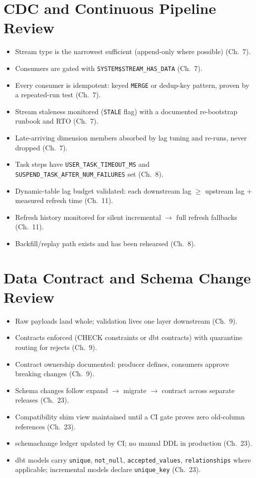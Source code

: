 \section{CDC and Continuous Pipeline Review}
\begin{itemize}
    \item[$\square$] Stream type is the narrowest sufficient (append-only where possible) (Ch.~7).
    \item[$\square$] Consumers are gated with \texttt{SYSTEM\$STREAM\_HAS\_DATA} (Ch.~7).
    \item[$\square$] Every consumer is idempotent: keyed \texttt{MERGE} or dedup-key pattern, proven by a repeated-run test (Ch.~7).
    \item[$\square$] Stream staleness monitored (\texttt{STALE} flag) with a documented re-bootstrap runbook and RTO (Ch.~7).
    \item[$\square$] Late-arriving dimension members absorbed by lag tuning and re-runs, never dropped (Ch.~7).
    \item[$\square$] Task steps have \texttt{USER\_TASK\_TIMEOUT\_MS} and \texttt{SUSPEND\_TASK\_AFTER\_NUM\_FAILURES} set (Ch.~8).
    \item[$\square$] Dynamic-table lag budget validated: each downstream lag $\geq$ upstream lag + measured refresh time (Ch.~11).
    \item[$\square$] Refresh history monitored for silent incremental $\rightarrow$ full refresh fallbacks (Ch.~11).
    \item[$\square$] Backfill/replay path exists and has been rehearsed (Ch.~8).
\end{itemize}

\section{Data Contract and Schema Change Review}
\begin{itemize}
    \item[$\square$] Raw payloads land whole; validation lives one layer downstream (Ch.~9).
    \item[$\square$] Contracts enforced (CHECK constraints or dbt contracts) with quarantine routing for rejects (Ch.~9).
    \item[$\square$] Contract ownership documented: producer defines, consumers approve breaking changes (Ch.~9).
    \item[$\square$] Schema changes follow expand $\rightarrow$ migrate $\rightarrow$ contract across separate releases (Ch.~23).
    \item[$\square$] Compatibility shim view maintained until a CI gate proves zero old-column references (Ch.~23).
    \item[$\square$] schemachange ledger updated by CI; no manual DDL in production (Ch.~23).
    \item[$\square$] dbt models carry \texttt{unique}, \texttt{not\_null}, \texttt{accepted\_values}, \texttt{relationships} where applicable; incremental models declare \texttt{unique\_key} (Ch.~23).
\end{itemize}

